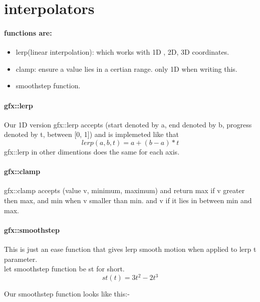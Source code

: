\section{interpolators}
\paragraph{functions are:}
\begin{itemize}
  \item{lerp(linear interpolation): which works with 1D , 2D, 3D coordinates.}
  \item{clamp: ensure a value lies in a certian range. only 1D when writing this.}
  \item{smoothstep function.}
\end{itemize}

\paragraph{gfx::lerp}
  Our 1D version gfx::lerp accepts (start denoted by a, end denoted by b, progress denoted by t, between [0, 1]) and is implemeted like that
  $$lerp(a, b, t) = a + (b - a) * t$$
  gfx::lerp in other dimentions does the same for each axis.

\paragraph{gfx::clamp}
  gfx::clamp accepts (value v, minimum, maximum) and return max if v greater then max, and min when v smaller than min.
  and v if it lies in between min and max.

\paragraph{gfx::smoothstep}
  This is just an ease function that gives lerp smooth motion when applied to lerp t parameter.\\
  let smoothstep function be st for short.
  \Large{$$st(t) = 3t^{2} - 2t^{3}$$}

Our smoothstep function looks like this:-  \\\\\\\\
  \begin{center}
  \end{center}

